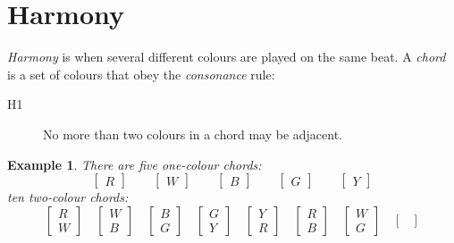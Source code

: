 \documentclass{scrartcl}
\newtheorem{example}{Example}
\begin{document}
\section{Harmony}
\emph{Harmony} is when several different colours are played on the same beat. A \emph{chord} is a set of colours that obey the \emph{consonance} rule:
\begin{description}
	\item[H1] No more than two colours in a chord may be adjacent.
\end{description} 
\begin{example}
There are five one-colour chords:
\begin{equation}\nonumber
\begin{bmatrix}
R
\end{bmatrix}
\qquad
\begin{bmatrix}
W
\end{bmatrix}
\qquad
\begin{bmatrix}
B
\end{bmatrix}
\qquad
\begin{bmatrix}
G
\end{bmatrix}
\qquad
\begin{bmatrix}
Y
\end{bmatrix}
\end{equation}
ten two-colour chords:
\begin{equation}\nonumber
\begin{bmatrix}
R \\ W
\end{bmatrix}
\quad
\begin{bmatrix}
W \\ B
\end{bmatrix}
\quad
\begin{bmatrix}
B \\ G
\end{bmatrix}
\quad
\begin{bmatrix}
G \\ Y
\end{bmatrix}
\quad
\begin{bmatrix}
Y \\ R
\end{bmatrix}
\quad
\begin{bmatrix}
R \\ B
\end{bmatrix}
\quad
\begin{bmatrix}
W \\ G
\end{bmatrix}
\quad
\begin{bmatrix}

\end{bmatrix}
\end{equation}
\end{example}
\end{document}
